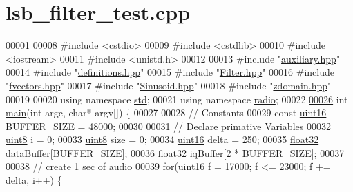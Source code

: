 \hypertarget{lsb__filter__test_8cpp_source}{\section{lsb\+\_\+filter\+\_\+test.\+cpp}
\label{lsb__filter__test_8cpp_source}
}

\begin{DoxyCode}
00001 
00008 \textcolor{preprocessor}{#include <cstdio>}
00009 \textcolor{preprocessor}{#include <cstdlib>}
00010 \textcolor{preprocessor}{#include <iostream>}
00011 \textcolor{preprocessor}{#include <unistd.h>}
00012 
00013 \textcolor{preprocessor}{#include "\hyperlink{auxiliary_8hpp}{auxiliary.hpp}"}
00014 \textcolor{preprocessor}{#include "\hyperlink{definitions_8hpp}{definitions.hpp}"}
00015 \textcolor{preprocessor}{#include "\hyperlink{Filter_8hpp}{Filter.hpp}"}
00016 \textcolor{preprocessor}{#include "\hyperlink{fvectors_8hpp}{fvectors.hpp}"}
00017 \textcolor{preprocessor}{#include "\hyperlink{Sinusoid_8hpp}{Sinusoid.hpp}"}
00018 \textcolor{preprocessor}{#include "\hyperlink{zdomain_8hpp}{zdomain.hpp}"}
00019 
00020 \textcolor{keyword}{using namespace }\hyperlink{namespacestd}{std};
00021 \textcolor{keyword}{using namespace }\hyperlink{namespaceradio}{radio};
00022 
\hypertarget{lsb__filter__test_8cpp_source_l00026}{}\hyperlink{lsb__filter__test_8cpp_a0ddf1224851353fc92bfbff6f499fa97}{00026} \textcolor{keywordtype}{int} \hyperlink{lsb__filter__test_8cpp_a0ddf1224851353fc92bfbff6f499fa97}{main}(\textcolor{keywordtype}{int} argc, \textcolor{keywordtype}{char}* argv[]) \{
00027 
00028     \textcolor{comment}{// Constants}
00029     \textcolor{keyword}{const} \hyperlink{definitions_8hpp_a05f6b0ae8f6a6e135b0e290c25fe0e4e}{uint16} BUFFER\_SIZE = 48000;
00030 
00031     \textcolor{comment}{// Declare primative Variables}
00032     \hyperlink{definitions_8hpp_adde6aaee8457bee49c2a92621fe22b79}{uint8} i = 0;
00033     \hyperlink{definitions_8hpp_adde6aaee8457bee49c2a92621fe22b79}{uint8} size = 0;
00034     \hyperlink{definitions_8hpp_a05f6b0ae8f6a6e135b0e290c25fe0e4e}{uint16} delta = 250;
00035     \hyperlink{definitions_8hpp_aacdc525d6f7bddb3ae95d5c311bd06a1}{float32} dataBuffer[BUFFER\_SIZE];
00036     \hyperlink{definitions_8hpp_aacdc525d6f7bddb3ae95d5c311bd06a1}{float32} iqBuffer[2 * BUFFER\_SIZE];
00037 
00038     \textcolor{comment}{// create 1 sec of audio}
00039     \textcolor{keywordflow}{for}(\hyperlink{definitions_8hpp_a05f6b0ae8f6a6e135b0e290c25fe0e4e}{uint16} f = 17000; f <= 23000; f += delta, i++) \{

\end{DoxyCode}
